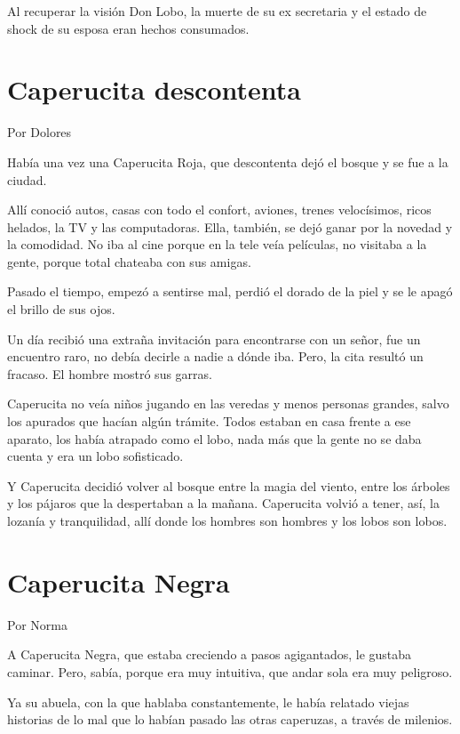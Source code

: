 \documentclass[11pt,twoside,openright,a5paper]{book}
\begin{document}
Al recuperar la visión Don Lobo, la muerte de su ex secretaria y el estado de shock de su esposa eran hechos consumados.

\section*{Caperucita descontenta}

\begin{flushright}Por Dolores\end{flushright}

Había una vez una Caperucita Roja, que descontenta dejó el bosque y se fue a la ciudad.

Allí conoció autos, casas con todo el confort, aviones, trenes velocísimos, ricos helados, la TV y las computadoras. Ella, también, se dejó ganar por la novedad y la comodidad. No iba al cine porque en la tele veía películas, no visitaba a la gente, porque total chateaba con sus amigas.

Pasado el tiempo, empezó a sentirse mal, perdió el dorado de la piel y se le apagó el brillo de sus ojos.

Un día recibió una extraña invitación para encontrarse con un señor, fue un encuentro raro, no debía decirle a nadie a dónde iba. Pero, la cita resultó un fracaso. El hombre mostró sus garras.

Caperucita no veía niños jugando en las veredas y menos personas grandes, salvo los apurados que hacían algún trámite. Todos estaban en casa frente a ese aparato, los había atrapado como el lobo, nada más que la gente no se daba cuenta y era un lobo sofisticado. 

Y Caperucita decidió volver al bosque entre la magia del viento, entre los árboles y los pájaros que la despertaban a la mañana. Caperucita volvió a tener, así, la lozanía y tranquilidad, allí donde los hombres son hombres y los lobos son lobos.

\section*{Caperucita Negra}

\begin{flushright}Por Norma\end{flushright}

A Caperucita Negra, que estaba creciendo a pasos agigantados, le gustaba caminar. Pero, sabía, porque era muy intuitiva, que andar sola era muy peligroso.

Ya su abuela, con la que hablaba constantemente, le había relatado viejas historias de lo mal que lo habían pasado las otras caperuzas, a través de milenios.
\end{document}
